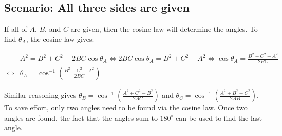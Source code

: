 \documentclass{article}
\begin{document}
\subsection*{Scenario: All three sides are given}

If all of \(A\), \(B\), and \(C\) are given, then the cosine law will determine the angles. To find \(\theta_A\), the cosine law gives:

\begin{align*}
& A^2 = B^2 + C^2 - 2BC\cos\theta_A 
\iff 2BC\cos\theta_A = B^2 + C^2 - A^2 
\iff \cos\theta_A = \frac{B^2 + C^2 - A^2}{2BC} \\
\iff & \theta_A = \cos^{-1}\left(\frac{B^2 + C^2 - A^2}{2BC}\right)
\end{align*}

Similar reasoning gives \(\theta_B = \cos^{-1}\left(\frac{A^2 + C^2 - B^2}{2AC}\right)\) and \(\theta_C = \cos^{-1}\left(\frac{A^2 + B^2 - C^2}{2AB}\right)\). To save effort, only two angles need to be found via the cosine law. Once two angles are found, the fact that the angles sum to \(180^\circ\) can be used to find the last angle.
\end{document}
